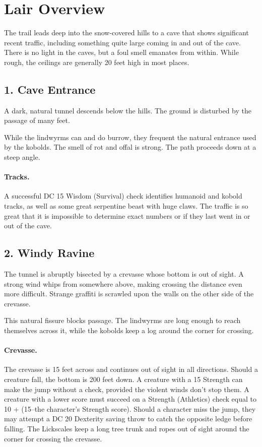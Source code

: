 \documentclass[10pt,a4paper,twoside,twocolumn,openany,bg=print,nodeprecatedcode]{dndbook}
\begin{document}
\section{Lair Overview}
The trail leads deep into the snow-covered hills to a cave that shows significant recent traffic, including something quite large coming in and out of the cave. There is no light in the caves, but a foul smell emanates from within. While rough, the ceilings are generally 20 feet high in most places.
\subsection{1. Cave Entrance}
\begin{DndReadAloud}{}
A dark, natural tunnel descends below the hills. The ground is disturbed by the passage of many feet.
\end{DndReadAloud}

While the lindwyrms can and do burrow, they frequent the natural entrance used by the kobolds. The smell of rot and offal is strong. The path proceeds down at a steep angle.
\paragraph{Tracks.}
A successful DC 15 Wisdom (Survival) check identifies humanoid and kobold tracks, as well as some great serpentine beast with huge claws. The traffic is so great that it is impossible to determine exact numbers or if they last went in or out of the cave.
\subsection{2. Windy Ravine}
\begin{DndReadAloud}{}
The tunnel is abruptly bisected by a crevasse whose bottom is out of sight. A strong wind whips from somewhere above, making crossing the distance even more difficult. Strange graffiti is scrawled upon the walls on the other side of the crevasse.
\end{DndReadAloud}

This natural fissure blocks passage. The lindwyrms are long enough to reach themselves across it, while the kobolds keep a log around the corner for crossing.
\paragraph{Crevasse.}
The crevasse is 15 feet across and continues out of sight in all directions. Should a creature fall, the bottom is 200 feet down. A creature with a 15 Strength can make the jump without a check, provided the violent winds don't stop them. A creature with a lower score must succeed on a Strength (Athletics) check equal to 10 + (15–the character's Strength score). Should a character miss the jump, they may attempt a DC 20 Dexterity saving throw to catch the opposite ledge before falling.
The Lickscales keep a long tree trunk and ropes out of sight around the corner for crossing the crevasse.
\end{document}
